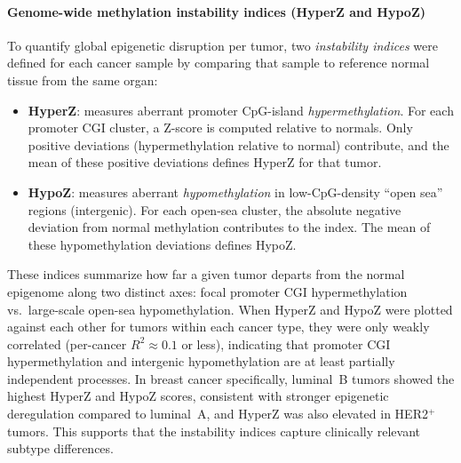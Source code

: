 \documentclass[10pt]{extarticle}
\begin{document}
\paragraph{Genome-wide methylation instability indices (HyperZ and HypoZ)}
To quantify global epigenetic disruption per tumor, two \textit{instability indices} were defined for each cancer sample by comparing that sample to reference normal tissue from the same organ:
\begin{itemize}[label=-]
    \item \textbf{HyperZ}: measures aberrant promoter CpG-island \textit{hypermethylation}. For each promoter CGI cluster, a Z-score is computed relative to normals. Only positive deviations (hypermethylation relative to normal) contribute, and the mean of these positive deviations defines HyperZ for that tumor.
    \item \textbf{HypoZ}: measures aberrant \textit{hypomethylation} in low-CpG-density ``open sea'' regions (intergenic). For each open-sea cluster, the absolute negative deviation from normal methylation contributes to the index. The mean of these hypomethylation deviations defines HypoZ.
\end{itemize}
These indices summarize how far a given tumor departs from the normal epigenome along two distinct axes: focal promoter CGI hypermethylation vs.\ large-scale open-sea hypomethylation. When HyperZ and HypoZ were plotted against each other for tumors within each cancer type, they were only weakly correlated (per-cancer $R^2 \approx 0.1$ or less), indicating that promoter CGI hypermethylation and intergenic hypomethylation are at least partially independent processes. In breast cancer specifically, luminal~B tumors showed the highest HyperZ and HypoZ scores, consistent with stronger epigenetic deregulation compared to luminal~A, and HyperZ was also elevated in HER2$^+$ tumors. This supports that the instability indices capture clinically relevant subtype differences.
\end{document}
